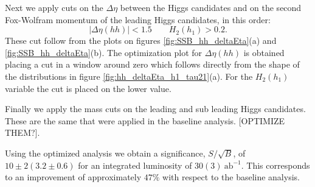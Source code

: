 Next we apply cuts on the $\Delta\eta$ between the Higgs candidates and on the second Fox-Wolfram momentum of the leading Higgs candidates, in this order:
\begin{equation}
	|\Delta\eta(hh)|<1.5 \qquad H_2(h_1)>0.2.
\end{equation} 
These cut follow from the plots on figures \ref{fig:SSB_hh_deltaEta}(a) and \ref{fig:SSB_hh_deltaEta}(b). The optimization plot for $\Delta\eta(hh)$ is obtained placing a cut in a window around zero which follows directly from the shape of the distributions in figure \ref{fig:hh_deltaEta_h1_tau21}(a). For the $H_2(h_1)$ variable the cut is placed on the lower value.

Finally we apply the mass cuts on the leading and sub leading Higgs candidates. These are the same that were applied in the baseline analysis. [OPTIMIZE THEM?].

Using the optimized analysis we obtain a significance, $S/\sqrt{B}$, of $10\pm2(3.2\pm0.6)$ for an integrated luminosity of $30(3)~\text{ab}^{-1}$. This corresponds to an improvement of approximately $47\%$ with respect to the baseline analysis.

